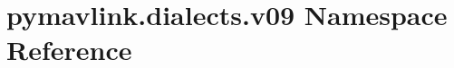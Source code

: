 \hypertarget{namespacepymavlink_1_1dialects_1_1v09}{}\section{pymavlink.\+dialects.\+v09 Namespace Reference}
\label{namespacepymavlink_1_1dialects_1_1v09}
